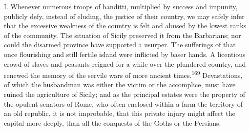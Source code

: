 I. Whenever numerous troops of banditti, multiplied by success
and impunity, publicly defy, instead of eluding, the justice of
their country, we may safely infer that the excessive weakness of
the country is felt and abused by the lowest ranks of the
community. The situation of Sicily preserved it from the
Barbarians; nor could the disarmed province have supported a
usurper. The sufferings of that once flourishing and still
fertile island were inflicted by baser hands. A licentious crowd
of slaves and peasants reigned for a while over the plundered
country, and renewed the memory of the servile wars of more
ancient times.\textsuperscript{169} Devastations, of which the husbandman was
either the victim or the accomplice, must have ruined the
agriculture of Sicily; and as the principal estates were the
property of the opulent senators of Rome, who often enclosed
within a farm the territory of an old republic, it is not
improbable, that this private injury might affect the capital
more deeply, than all the conquests of the Goths or the Persians.


